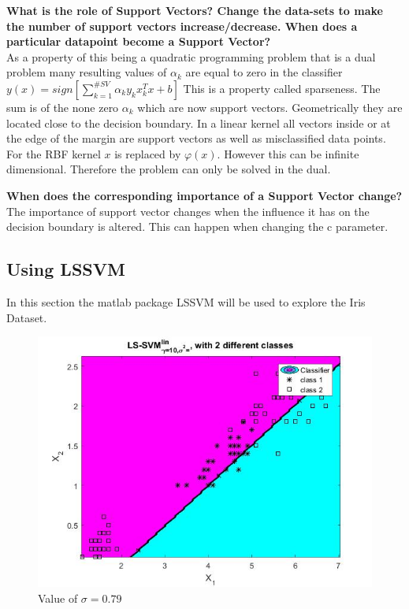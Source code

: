 \documentclass[11pt,oneside,a4paper]{article}
\begin{document}
\textbf{What is the role of Support Vectors? Change the data-sets to make the number of support vectors
increase/decrease. When does a particular datapoint become a Support Vector?}\\
	As a property of this being a quadratic programming problem that is  a dual problem many resulting values of $ \alpha_{k}$ are equal to zero in the classifier $ y(x)= sign[\sum_{k = 1}^{\#SV} \alpha_{k} y_{k} x_{k}^{T}x + b] $ This is a property called sparseness. The sum is of the none zero $\alpha_{k}$ which are now support vectors. Geometrically they are located close to the decision boundary. In a linear kernel all vectors inside or at the edge of the margin are support vectors as well as misclassified data points. For the RBF kernel $x$ is replaced by $\varphi(x)$. However this can be infinite dimensional. Therefore the problem can only be solved in the dual. 
	
\textbf{When does the corresponding importance of a Support Vector change?}\\
The importance of support vector changes when the influence it has on the decision boundary is altered. This can happen when changing the c parameter.

\subsection{Using LSSVM}
In this section the matlab package LSSVM will be used to explore the Iris Dataset.

\begin{figure}[H]
	\centering
	\includegraphics[scale=0.5]{../Figures/iris_intial}
	\caption{Value of $\sigma = 0.79$}
\end{figure}
\end{document}
